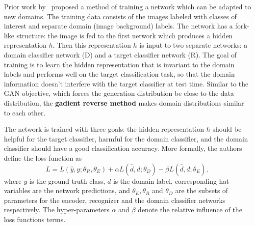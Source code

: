 \documentclass{article}
\begin{document}

    
    Prior work by~\cite{ganin2014unsupervised} proposed a method of training a network 
    which can be adapted to new domains. The training data consists of the images
    labeled with classes of interest and separate domain (image background) labels. 
   The network has a fork-like structure: the image is fed to the
    first network which produces a hidden representation $h$. Then this representation $h$ is input to two separate networks: a domain classifier network (D) and 
    a target classifier network (R). The goal of training is to learn the hidden 
    representation that is invariant to the domain labels and performs well on the target classification task, so that the domain information doesn't 
    interfere with the target classifier at test time. Similar to the GAN objective, which forces the generation distribution be close to the data distribution,
    the {\bf gadient reverse method} makes domain distributions similar to each other.

    The network is trained with three goals: the hidden representation $h$ should
    be helpful for the target classifier, harmful for the domain classifier,
    and the domain classifier should have a good classification accuracy. More 
    formally, the authors define the loss function as
    \begin{equation}
        L = L(\hat{y}, y; \theta_R, \theta_E) + 
        \alpha L(\hat{d}, d; \theta_D) -
        \beta L(\hat{d}, d; \theta_E),
        \label{eq:grm}
    \end{equation}
    where $y$ is the ground truth class, $d$ is the domain label, corresponding
    hat variables are the network predictions, and $\theta_E, \theta_R$ and $\theta_D$ are the subsets of  parameters for the encoder,
    recognizer and the domain classifier networks respectively. The hyper-parameters
    $\alpha$ and $\beta$ denote the relative influence of the loss functions terms.
\end{document}
